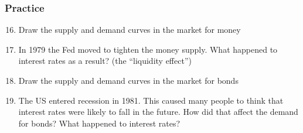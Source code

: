 \documentclass{beamer}
\begin{document}
\begin{practiceframe}
    \frametitle{Practice}

    \begin{enumerate}
    \setcounter{enumi}{15}
        \item Draw the supply and demand curves in the market for money
        \item In 1979 the Fed moved to tighten the money supply.  What happened to interest rates as a result? (the “liquidity effect”)
        \item Draw the supply and demand curves in the market for bonds
        \item The US entered recession in 1981.  This caused many people to think that interest rates were likely to fall in the future.  How did that affect the demand for bonds?  What happened to interest rates?
    \end{enumerate}

\end{practiceframe}
\end{document}

